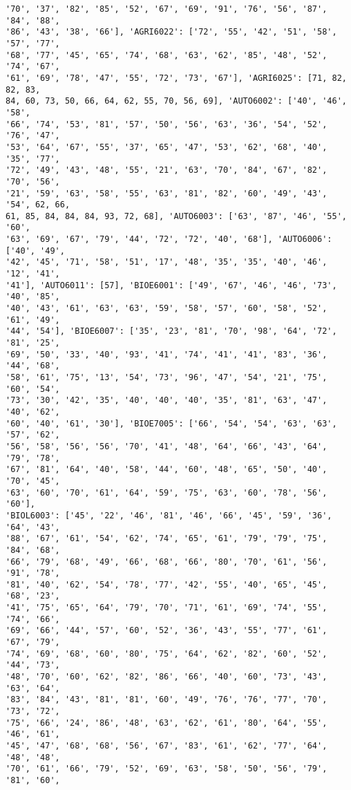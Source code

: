 \documentclass[11pt]{article}
\begin{document}
\begin{Verbatim}[commandchars=\\\{\}]
'70', '37', '82', '85', '52', '67', '69', '91', '76', '56', '87', '84', '88',
'86', '43', '38', '66'], 'AGRI6022': ['72', '55', '42', '51', '58', '57', '77',
'68', '77', '45', '65', '74', '68', '63', '62', '85', '48', '52', '74', '67',
'61', '69', '78', '47', '55', '72', '73', '67'], 'AGRI6025': [71, 82, 82, 83,
84, 60, 73, 50, 66, 64, 62, 55, 70, 56, 69], 'AUTO6002': ['40', '46', '58',
'66', '74', '53', '81', '57', '50', '56', '63', '36', '54', '52', '76', '47',
'53', '64', '67', '55', '37', '65', '47', '53', '62', '68', '40', '35', '77',
'72', '49', '43', '48', '55', '21', '63', '70', '84', '67', '82', '70', '56',
'21', '59', '63', '58', '55', '63', '81', '82', '60', '49', '43', '54', 62, 66,
61, 85, 84, 84, 84, 93, 72, 68], 'AUTO6003': ['63', '87', '46', '55', '60',
'63', '69', '67', '79', '44', '72', '72', '40', '68'], 'AUTO6006': ['40', '49',
'42', '45', '71', '58', '51', '17', '48', '35', '35', '40', '46', '12', '41',
'41'], 'AUTO6011': [57], 'BIOE6001': ['49', '67', '46', '46', '73', '40', '85',
'40', '43', '61', '63', '63', '59', '58', '57', '60', '58', '52', '61', '49',
'44', '54'], 'BIOE6007': ['35', '23', '81', '70', '98', '64', '72', '81', '25',
'69', '50', '33', '40', '93', '41', '74', '41', '41', '83', '36', '44', '68',
'58', '61', '75', '13', '54', '73', '96', '47', '54', '21', '75', '60', '54',
'73', '30', '42', '35', '40', '40', '40', '35', '81', '63', '47', '40', '62',
'60', '40', '61', '30'], 'BIOE7005': ['66', '54', '54', '63', '63', '57', '62',
'56', '58', '56', '56', '70', '41', '48', '64', '66', '43', '64', '79', '78',
'67', '81', '64', '40', '58', '44', '60', '48', '65', '50', '40', '70', '45',
'63', '60', '70', '61', '64', '59', '75', '63', '60', '78', '56', '60'],
'BIOL6003': ['45', '22', '46', '81', '46', '66', '45', '59', '36', '64', '43',
'88', '67', '61', '54', '62', '74', '65', '61', '79', '79', '75', '84', '68',
'66', '79', '68', '49', '66', '68', '66', '80', '70', '61', '56', '91', '78',
'81', '40', '62', '54', '78', '77', '42', '55', '40', '65', '45', '68', '23',
'41', '75', '65', '64', '79', '70', '71', '61', '69', '74', '55', '74', '66',
'69', '66', '44', '57', '60', '52', '36', '43', '55', '77', '61', '67', '79',
'74', '69', '68', '60', '80', '75', '64', '62', '82', '60', '52', '44', '73',
'48', '70', '60', '62', '82', '86', '66', '40', '60', '73', '43', '63', '64',
'83', '84', '43', '81', '81', '60', '49', '76', '76', '77', '70', '73', '72',
'75', '66', '24', '86', '48', '63', '62', '61', '80', '64', '55', '46', '61',
'45', '47', '68', '68', '56', '67', '83', '61', '62', '77', '64', '48', '48',
'70', '61', '66', '79', '52', '69', '63', '58', '50', '56', '79', '81', '60',

\end{Verbatim}
\end{document}

